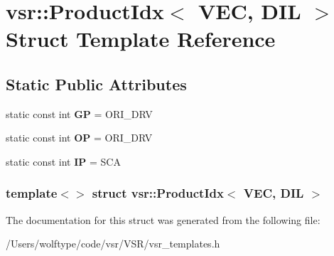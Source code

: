 \hypertarget{structvsr_1_1_product_idx_3_01_v_e_c_00_01_d_i_l_01_4}{\section{vsr\-:\-:Product\-Idx$<$ V\-E\-C, D\-I\-L $>$ Struct Template Reference}
\label{structvsr_1_1_product_idx_3_01_v_e_c_00_01_d_i_l_01_4}
}
\subsection*{Static Public Attributes}
\begin{DoxyCompactItemize}
\item 
\hypertarget{structvsr_1_1_product_idx_3_01_v_e_c_00_01_d_i_l_01_4_ab4002944a322da8d4be2dfe61efbd476}{static const int {\bfseries G\-P} = O\-R\-I\-\_\-\-D\-R\-V}\label{structvsr_1_1_product_idx_3_01_v_e_c_00_01_d_i_l_01_4_ab4002944a322da8d4be2dfe61efbd476}

\item 
\hypertarget{structvsr_1_1_product_idx_3_01_v_e_c_00_01_d_i_l_01_4_abd11f56533dabeac17c3f3ec6b5635f5}{static const int {\bfseries O\-P} = O\-R\-I\-\_\-\-D\-R\-V}\label{structvsr_1_1_product_idx_3_01_v_e_c_00_01_d_i_l_01_4_abd11f56533dabeac17c3f3ec6b5635f5}

\item 
\hypertarget{structvsr_1_1_product_idx_3_01_v_e_c_00_01_d_i_l_01_4_a9c5e967da3925c251ac1b8c8d11a6652}{static const int {\bfseries I\-P} = S\-C\-A}\label{structvsr_1_1_product_idx_3_01_v_e_c_00_01_d_i_l_01_4_a9c5e967da3925c251ac1b8c8d11a6652}

\end{DoxyCompactItemize}
\subsubsection*{template$<$$>$ struct vsr\-::\-Product\-Idx$<$ V\-E\-C, D\-I\-L $>$}



The documentation for this struct was generated from the following file\-:\begin{DoxyCompactItemize}
\item 
/\-Users/wolftype/code/vsr/\-V\-S\-R/vsr\-\_\-templates.\-h\end{DoxyCompactItemize}
